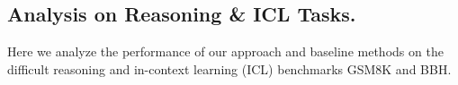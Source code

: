 \subsection{Analysis on Reasoning \& ICL Tasks.}
Here we analyze the performance of our approach and baseline methods on the difficult reasoning and in-context learning (ICL) benchmarks GSM8K and BBH.





